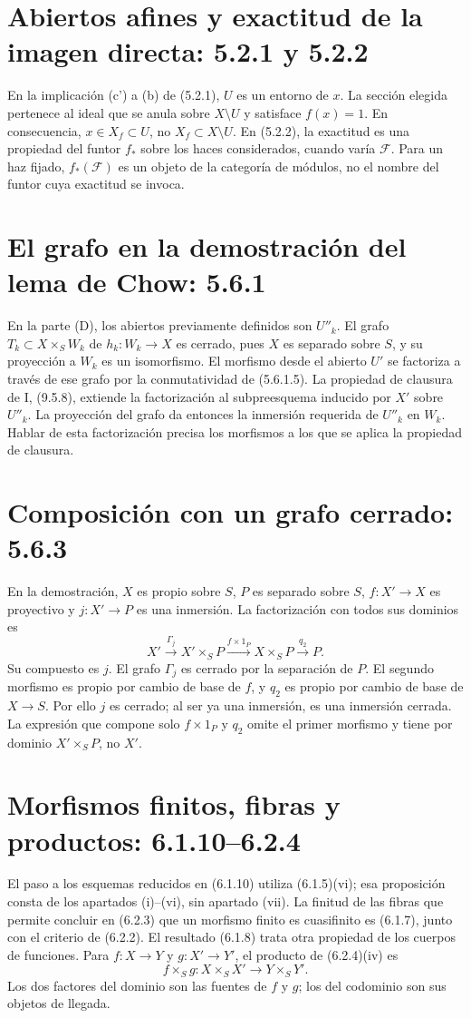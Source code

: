 \documentclass[11pt,a4paper]{article}
\begin{document}
\section{Abiertos afines y exactitud de la imagen directa: 5.2.1 y 5.2.2}
En la implicación (c') a (b) de (5.2.1), $U$ es un entorno de $x$.
La sección elegida pertenece al ideal que se anula sobre $X\setminus U$
y satisface $f(x)=1$. En consecuencia,
$x\in X_f\subset U$, no $X_f\subset X\setminus U$.
En (5.2.2), la exactitud es una propiedad del funtor $f_*$ sobre
los haces considerados, cuando varía $\mathcal F$. Para un haz
fijado, $f_*(\mathcal F)$ es un objeto de la categoría de módulos,
no el nombre del funtor cuya exactitud se invoca.

\section{El grafo en la demostración del lema de Chow: 5.6.1}
En la parte (D), los abiertos previamente definidos son $U''_k$.
El grafo $T_k\subset X\times_S W_k$ de $h_k:W_k\to X$ es cerrado,
pues $X$ es separado sobre $S$, y su proyección a $W_k$ es un
isomorfismo. El morfismo desde el abierto $U'$ se factoriza a través
de ese grafo por la conmutatividad de (5.6.1.5).
La propiedad de clausura de I, (9.5.8), extiende la factorización
al subpreesquema inducido por $X'$ sobre $U''_k$. La proyección del
grafo da entonces la inmersión requerida de $U''_k$ en $W_k$.
Hablar de esta factorización precisa los morfismos a los que se
aplica la propiedad de clausura.

\section{Composición con un grafo cerrado: 5.6.3}
En la demostración, $X$ es propio sobre $S$, $P$ es separado sobre
$S$, $f:X'\to X$ es proyectivo y $j:X'\to P$ es una inmersión.
La factorización con todos sus dominios es
\[
X'\xrightarrow{\Gamma_j}X'\times_S P
\xrightarrow{f\times1_P}X\times_S P
\xrightarrow{q_2}P.
\]
Su compuesto es $j$. El grafo $\Gamma_j$ es cerrado por la
separación de $P$. El segundo morfismo es propio por cambio de
base de $f$, y $q_2$ es propio por cambio de base de $X\to S$.
Por ello $j$ es cerrado; al ser ya una inmersión, es una inmersión
cerrada. La expresión que compone solo $f\times1_P$ y $q_2$
omite el primer morfismo y tiene por dominio $X'\times_S P$,
no $X'$.

\section{Morfismos finitos, fibras y productos: 6.1.10--6.2.4}
El paso a los esquemas reducidos en (6.1.10) utiliza (6.1.5)(vi);
esa proposición consta de los apartados (i)--(vi), sin apartado (vii).
La finitud de las fibras que permite concluir en (6.2.3) que un
morfismo finito es cuasifinito es (6.1.7), junto con el criterio
de (6.2.2). El resultado (6.1.8) trata otra propiedad de los
cuerpos de funciones.
Para $f:X\to Y$ y $g:X'\to Y'$, el producto de (6.2.4)(iv) es
\[
f\times_S g:X\times_S X'\longrightarrow Y\times_S Y'.
\]
Los dos factores del dominio son las fuentes de $f$ y $g$;
los del codominio son sus objetos de llegada.
\end{document}
